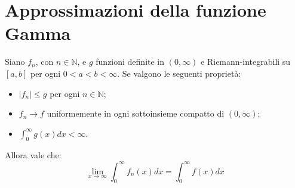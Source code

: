 \section{Approssimazioni della funzione Gamma}
\begin{lemma}
	Siano $f_n$, con $n\in\mathbb{N}$, e $g$ funzioni definite in $(0,\infty)$ e Riemann-integrabili su $[a,b]$ per ogni
	$0<a<b<\infty$. Se valgono le seguenti proprietà:
	\begin{itemize}
		\item $|f_n|\le g$ per ogni $n\in\mathbb{N}$;
		\item $f_n\to f$ uniformemente in ogni sottoinsieme compatto di $(0,\infty)$;
		\item $\int_0^\infty{g(x)dx}<\infty$.
	\end{itemize}
	Allora vale che:
	\begin{equation*}
		\lim_{x\to\infty}\int_0^\infty f_n(x)dx=\int_0^\infty f(x)dx
	\end{equation*}
\end{lemma}

